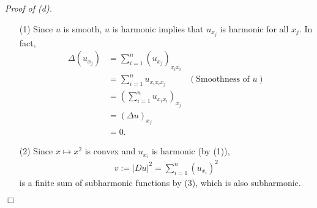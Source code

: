 \documentclass{article}
\begin{document}
\emph{Proof of (d).}
\begin{enumerate}
\item[(1)]
  Since $u$ is smooth,
  $u$ is harmonic implies that $u_{x_j}$ is harmonic for all $x_j$.
  In fact,
  \begin{align*}
    \Delta (u_{x_j})
    &= \sum_{i=1}^{n} (u_{x_j})_{x_i x_i} \\
    &= \sum_{i=1}^{n} u_{x_i x_i x_j}
      &(\text{Smoothness of $u$}) \\
    &= \left(\sum_{i=1}^{n} u_{x_i x_i}\right)_{x_j} \\
    &= \left(\Delta u\right)_{x_j} \\
    &= 0.
  \end{align*}

\item[(2)]
  Since $x \mapsto x^2$ is convex and $u_{x_i}$ is harmonic (by (1)),
  \begin{align*}
    v := |Du|^2 = \sum_{i=1}^n (u_{x_i})^2
  \end{align*}
  is a finite sum of subharmonic functions by (3),
  which is also subharmonic.
\end{enumerate}
$\Box$ \\\\



\end{document}
